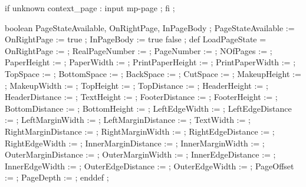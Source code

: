 


\unprotect

\appendtoks
  if unknown context_page : input mp-page ; fi ;
\to \MPinitializations


  boolean PageStateAvailable, OnRightPage, InPageBody ;
  PageStateAvailable := OnRightPage := true ;
  InPageBody         := \ifinpagebody true \else false \fi ;
  def LoadPageState =
    OnRightPage         :=      \MPonrightpage ;
    RealPageNumber      :=  \the\realpageno ;
    PageNumber          :=  \the\pageno ;
    NOfPages            :=      \lastpage ;
    PaperHeight         :=  \the\papierhoogte ;
    PaperWidth          :=  \the\papierbreedte ;
    PrintPaperHeight    :=  \the\printpapierhoogte ;
    PrintPaperWidth     :=  \the\printpapierbreedte ;
    TopSpace            :=  \the\kopwit ;
    BottomSpace         :=  \the\bodemwit ;
    BackSpace           :=  \the\rugwit ;
    CutSpace            :=  \the\snijwit ;
    MakeupHeight        :=  \the\zethoogte ;
    MakeupWidth         :=  \the\zetbreedte ;
    TopHeight           :=  \the\bovenhoogte ;
    TopDistance         := \@the\bovenafstand ;
    HeaderHeight        :=  \the\hoofdhoogte ;
    HeaderDistance      := \@the\hoofdafstand ;
    TextHeight          :=  \the\teksthoogte ;
    FooterDistance      := \@the\voetafstand ;
    FooterHeight        :=  \the\voethoogte ;
    BottomDistance      := \@the\onderafstand ;
    BottomHeight        :=  \the\onderhoogte ;
    LeftEdgeWidth       :=  \the\linkerrandbreedte ;
    LeftEdgeDistance    := \@the\linkerrandafstand ;
    LeftMarginWidth     :=  \the\linkermargebreedte ;
    LeftMarginDistance  := \@the\linkermargeafstand ;
    TextWidth           :=  \the\tekstbreedte ;
    RightMarginDistance := \@the\rechtermargeafstand ;
    RightMarginWidth    :=  \the\rechtermargebreedte ;
    RightEdgeDistance   := \@the\rechterrandafstand ;
    RightEdgeWidth      :=  \the\rechterrandbreedte ;
    InnerMarginDistance := \@the\innermargindistance ;
    InnerMarginWidth    :=  \the\innermarginwidth ;
    OuterMarginDistance := \@the\outermargindistance ;
    OuterMarginWidth    :=  \the\outermarginwidth ;
    InnerEdgeDistance   := \@the\inneredgedistance ;
    InnerEdgeWidth      :=  \the\inneredgewidth ;
    OuterEdgeDistance   := \@the\outeredgedistance ;
    OuterEdgeWidth      :=  \the\outeredgewidth ;
    PageOffset          :=  \the\pageoffset ;
    PageDepth           :=  \the\pagedepth ;
  enddef ;
\stopuseMPgraphic

